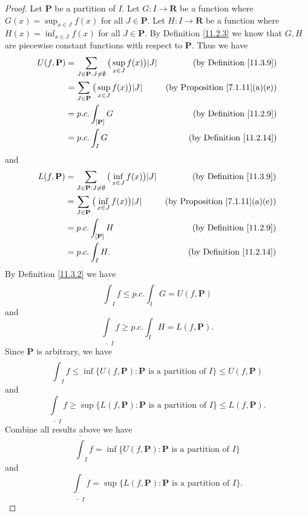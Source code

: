 \begin{proof}
    Let \(\mathbf{P}\) be a partition of \(I\).
    Let \(G : I \to \mathbf{R}\) be a function where \(G(x) = \sup_{x \in J} f(x)\) for all \(J \in \mathbf{P}\).
    Let \(H : I \to \mathbf{R}\) be a function where \(H(x) = \inf_{x \in J} f(x)\) for all \(J \in \mathbf{P}\).
    By Definition \ref{11.2.3} we know that \(G, H\) are piecewise constant functions with respect to \(\mathbf{P}\).
    Thus we have
    \begin{align*}
        U(f, \mathbf{P}) & = \sum_{J \in \mathbf{P} : J \neq \emptyset} \big(\sup_{x \in J} f(x)\big) \abs*{J} & \text{(by Definition \ref{11.3.9})}        \\
                         & = \sum_{J \in \mathbf{P}} \big(\sup_{x \in J} f(x)\big) \abs*{J}                    & \text{(by Proposition \ref{7.1.11}(a)(e))} \\
                         & = p.c. \int_{[\mathbf{P}]} G                                                        & \text{(by Definition \ref{11.2.9})}        \\
                         & = p.c. \int_I G                                                                     & \text{(by Definition \ref{11.2.14})}
    \end{align*}
    and
    \begin{align*}
        L(f, \mathbf{P}) & = \sum_{J \in \mathbf{P} : J \neq \emptyset} \big(\inf_{x \in J} f(x)\big) \abs*{J} & \text{(by Definition \ref{11.3.9})}        \\
                         & = \sum_{J \in \mathbf{P}} \big(\inf_{x \in J} f(x)\big) \abs*{J}                    & \text{(by Proposition \ref{7.1.11}(a)(e))} \\
                         & = p.c. \int_{[\mathbf{P}]} H                                                        & \text{(by Definition \ref{11.2.9})}        \\
                         & = p.c. \int_I H.                                                                    & \text{(by Definition \ref{11.2.14})}
    \end{align*}
    By Definition \ref{11.3.2} we have
    \[
        \overline{\int}_I f \leq p.c. \int_I G = U(f, \mathbf{P})
    \]
    and
    \[
        \underline{\int}_I f \geq p.c. \int_I H = L(f, \mathbf{P}).
    \]
    Since \(\mathbf{P}\) is arbitrary, we have
    \[
        \overline{\int}_I f \leq \inf\big\{U(f, \mathbf{P}) : \mathbf{P} \text{ is a partition of } I\big\} \leq U(f, \mathbf{P})
    \]
    and
    \[
        \underline{\int}_I f \geq \sup\big\{L(f, \mathbf{P}) : \mathbf{P} \text{ is a partition of } I\big\} \leq L(f, \mathbf{P}).
    \]
    Combine all results above we have
    \[
        \overline{\int}_I f = \inf\big\{U(f, \mathbf{P}) : \mathbf{P} \text{ is a partition of } I\big\}
    \]
    and
    \[
        \underline{\int}_I f = \sup\big\{L(f, \mathbf{P}) : \mathbf{P} \text{ is a partition of } I\big\}.
    \]
\end{proof}

